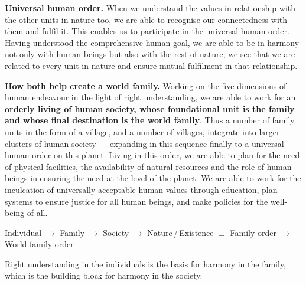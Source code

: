 \textbf{Universal human order.} When we understand the values in relationship
with the other units in nature too, we are able to recognise our connectedness
with them and fulfil it. This enables us to participate in the universal human
order. Having understood the comprehensive human goal, we are able to be in
harmony not only with human beings but also with the rest of nature; we see
that we are related to every unit in nature and ensure mutual fulfilment in
that relationship.

\textbf{How both help create a world family.} Working on the five dimensions
of human endeavour in the light of right understanding, we are able to work
for an \textbf{orderly living of human society, whose foundational unit is the
family and whose final destination is the world family}. Thus a number of
family units in the form of a village, and a number of villages, integrate
into larger clusters of human society --- expanding in this sequence finally
to a universal human order on this planet. Living in this order, we are able
to plan for the need of physical facilities, the availability of natural
resources and the role of human beings in ensuring the need at the level of
the planet. We are able to work for the inculcation of universally acceptable
human values through education, plan systems to ensure justice for all human
beings, and make policies for the well-being of all.

\begin{keybox}
Individual $\rightarrow$ Family $\rightarrow$ Society $\rightarrow$
Nature\,/\,Existence \hfill $\equiv$ \hfill Family order $\rightarrow$ World
family order
\end{keybox}


\ans Right understanding in the individuals is the basis for harmony in the
family, which is the building block for harmony in the society.


